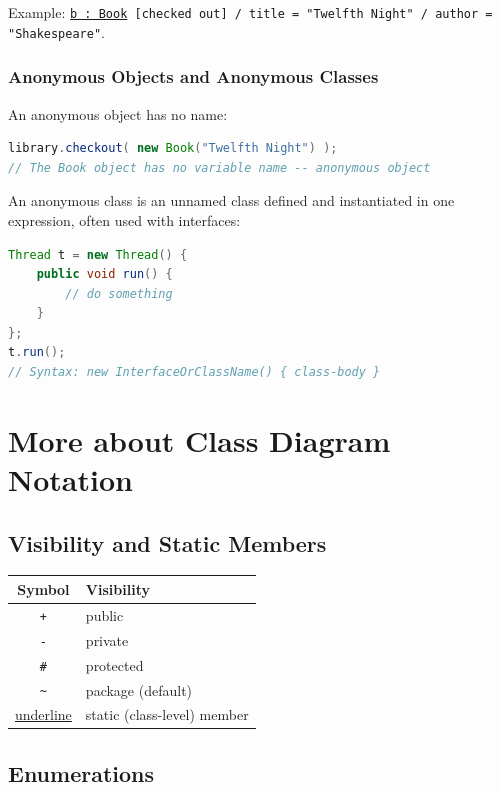\documentclass[11pt, a4paper, notitlepage]{report}
\theoremstyle{definition}
\theoremstyle{remark}
\theoremstyle{definition}
\begin{document}
Example: \texttt{\underline{b : Book} [checked out] / title = "Twelfth Night"
/ author = "Shakespeare"}.

\subsubsection{Anonymous Objects and Anonymous Classes}

An anonymous object has no name:
\begin{lstlisting}[language=Java]
library.checkout( new Book("Twelfth Night") );
// The Book object has no variable name -- anonymous object
\end{lstlisting}

An anonymous class is an unnamed class defined and instantiated in one
expression, often used with interfaces:
\begin{lstlisting}[language=Java]
Thread t = new Thread() {
    public void run() {
        // do something
    }
};
t.run();
// Syntax: new InterfaceOrClassName() { class-body }
\end{lstlisting}

\section{More about Class Diagram Notation}
\label{sec:ch6-more-notation}

\subsection{Visibility and Static Members}

\begin{center}
\begin{tabular}{@{}cl@{}}
  \toprule
  Symbol & Visibility \\
  \midrule
  \texttt{+} & public \\
  \texttt{-} & private \\
  \texttt{\#} & protected \\
  \texttt{\textasciitilde} & package (default) \\
  \midrule
  \underline{underline} & static (class-level) member \\
  \bottomrule
\end{tabular}
\end{center}

\subsection{Enumerations}
\end{document}
